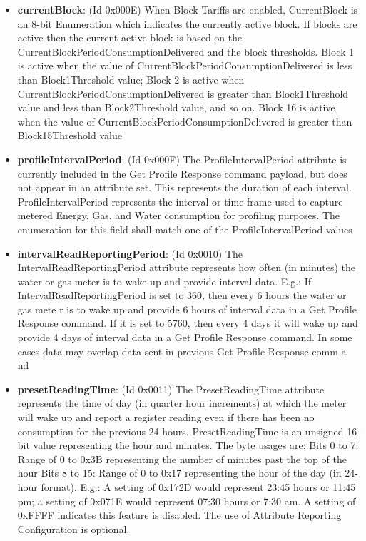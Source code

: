 \begin{itemize}
\item \textbf{currentBlock}: (Id 0x000E) When Block Tariffs are enabled, CurrentBlock is an 8-bit Enumeration which indicates the currently active block. If blocks are active then the current active block is based on the CurrentBlockPeriodConsumptionDelivered and the block thresholds. Block 1 is active when the value of CurrentBlockPeriodConsumptionDelivered is less than Block1Threshold value; Block 2 is active when CurrentBlockPeriodConsumptionDelivered is greater than Block1Threshold value and less than Block2Threshold value, and so on. Block 16 is active when the value of CurrentBlockPeriodConsumptionDelivered is greater than Block15Threshold value
\item \textbf{profileIntervalPeriod}: (Id 0x000F) The ProfileIntervalPeriod attribute is currently included in the Get Profile Response command payload, but does not appear in an attribute set. This represents the duration of each interval. ProfileIntervalPeriod represents the interval or time frame used to capture metered Energy, Gas, and Water consumption for profiling purposes. The enumeration for this field shall match one of the ProfileIntervalPeriod values
\item \textbf{intervalReadReportingPeriod}: (Id 0x0010) The IntervalReadReportingPeriod attribute represents how often (in minutes) the water or gas meter is to wake up and provide interval data. E.g.: If IntervalReadReportingPeriod is set to 360, then every 6 hours the water or gas mete r is to wake up and provide 6 hours of interval data in a Get Profile Response command. If it is set to 5760, then every 4 days it will wake up and provide 4 days of interval data in a Get Profile Response command. In some cases data may overlap data sent in previous Get Profile Response comm a nd
\item \textbf{presetReadingTime}: (Id 0x0011) The PresetReadingTime attribute represents the time of day (in quarter hour increments) at which the meter will wake up and report a register reading even if there has been no consumption for the previous 24 hours. PresetReadingTime is an unsigned 16-bit value representing the hour and minutes. The byte usages are: Bits 0 to 7: Range of 0 to 0x3B representing the number of minutes past the top of the hour Bits 8 to 15: Range of 0 to 0x17 representing the hour of the day (in 24-hour format). E.g.: A setting of 0x172D would represent 23:45 hours or 11:45 pm; a setting of 0x071E would represent 07:30 hours or 7:30 am. A setting of 0xFFFF indicates this feature is disabled. The use of Attribute Reporting Configuration is optional.

\end{itemize}
